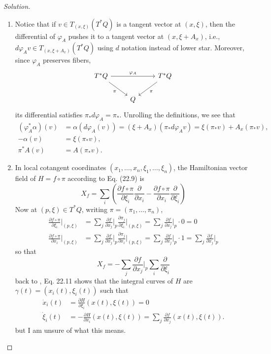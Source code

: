 \begin{proof}[Solution]\leavevmode
	\begin{enumerate}[label=\alph*.]
		\item Notice that if $v\in T_{(x,\xi)}(T^*Q)$ is a tangent vector at  $(x,\xi)$, then the differential of $\varphi_A$ pushes it to a tangent vector at $(x,\xi+A_x)$, i.e., $d\varphi_Av\in T_{(x,\xi+A_x)}(T^*Q)$ using $d$ notation instead of lower star. Moreover, since $\varphi_A$ preserves fibers,
\[\begin{tikzcd}
T^*Q\arrow[dr,swap,"\pi"]\arrow[rr,"\varphi_A"]&&T^*Q\arrow[dl,"\pi"]\\
&Q
\end{tikzcd}\]
its differential satisfies $\pi_*d\varphi_A=\pi_*$. Unrolling the definitions, we see that
			\begin{align*}
				(\varphi^*_A\alpha)(v)& =\alpha(d\varphi _A(v))=(\xi+A_x)(\pi_*d\varphi _Av)=\xi(\pi_*v)+A_x(\pi_*v),\\
				-\alpha(v)& =\xi(\pi_*v),\\
				\pi^*A(v)&=A(\pi_*v).
			\end{align*}
		
		\item In local cotangent coordinates $(x_1,\ldots,x_n,\xi_1,\ldots,\xi_n)$, the Hamiltonian vector field of $H=f\circ \pi$ according to \cite{lee} Eq. (22.9) is
			\[X_f=\sum_{i}\left( \frac{\partial f\circ \pi}{\partial \xi_i}\frac{\partial }{\partial x_i}-\frac{\partial f\circ \pi}{\partial x_i}\frac{\partial }{\partial \xi_i} \right) \]
			Now at $(p,\xi)\in T^*Q$, writing $\pi=(\pi_1,\ldots,\pi_n)$,
			\begin{align*}
				\frac{\partial f\circ \pi}{\partial \xi_i}\Big|_{(p,\xi)}&=\sum_{j}\frac{\partial f}{\partial x_j}\Big|_{p}\frac{\partial \pi_j}{\partial \xi_i}\Big|_{(p,\xi)}=\sum_{j}\frac{\partial f}{\partial x_j}\Big|_{p}\cdot 0=0\\
				\frac{\partial f\circ \pi}{\partial x_i}\Big|_{(p,\xi)}&=\sum_{j}\frac{\partial f}{\partial x_j}\Big|_{p}\frac{\partial \pi_j}{\partial x_i}\Big|_{(p,\xi)}=\sum_{j}\frac{\partial f}{\partial x_j}\Big|_{p}\cdot 1=\sum_{j}\frac{\partial f}{\partial x_j}\Big|_{p}
			\end{align*}
			so that
			\[X_f=-\sum_{j}\frac{\partial f}{\partial x_j}\Big|_{p}\sum_{i}\frac{\partial }{\partial \xi_i}\]
back to \cite{lee}, Eq. 22.11 shows that the integral curves of $H$ are $\gamma(t)=(x_i(t),\xi_i(t))$ such that
\begin{align*}
	\dot x_i (t) &=\frac{\partial H}{\partial \xi_i}(x(t),\xi(t))=0\\
	\dot \xi_i(t)& =-\frac{\partial H}{\partial x_i}(x(t),\xi(t))=\sum_{j}\frac{\partial f}{\partial x_j}(x(t),\xi(t)).
\end{align*}
but I am unsure of what this means.
	\end{enumerate}
\end{proof}

